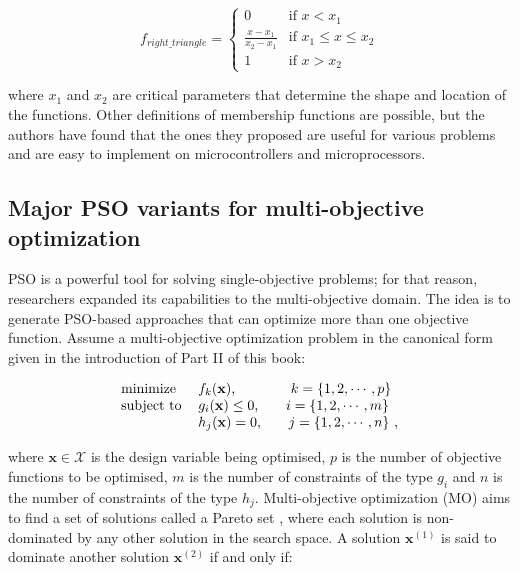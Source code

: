 \begin{equation}
    f_{right\_triangle} = \begin{cases}
    0 & \text{if $x < x_1$}\\
    \frac{x -x_1}{x_2 -x_1} & \text{if $x_1 \leq x \leq x_2$}\\
    1 & \text{if $x > x_2$}
    \end{cases}
\end{equation}

\noindent where $x_1$ and $x_2$ are critical parameters that determine the shape and location of the functions. Other definitions of membership functions are possible, but the authors have found that the ones they proposed are useful for various problems and are easy to implement on microcontrollers and microprocessors.

\subsection{Major PSO variants for multi-objective optimization}
\label{sec:variants2}

PSO is a powerful tool for solving single-objective problems; for that reason, researchers expanded its capabilities to the multi-objective domain. The idea is to generate PSO-based approaches that can optimize more than one objective function. Assume a multi-objective optimization problem in the canonical form given in the introduction of Part II of this book:

\[
\begin{tabular}{ll}
minimize        & $f_k(\mathbf{x})$, \ \ \ \ \ \ \ \ \ \ \ $k=\{1,2,\cdots,p\}$ \\ 
subject to      & $g_i(\mathbf{x}) \leq 0$, \ \ \ \ \ $i=\{1,2,\cdots,m\}$ \\
                & $h_j(\mathbf{x}) = 0$, \ \ \ \ \ $j=\{1,2,\cdots,n\}$ ,\\
\end{tabular}
\]

\noindent where $\mathbf{x} \in \mathcal{X}$ is the design variable being optimised, $p$ is the number of objective functions to be optimised, $m$ is the number of constraints of the type $g_i$ and $n$ is the number of constraints of the type $h_j$. 
Multi-objective optimization (MO) aims to find a set of solutions called a Pareto set \cite{coello2007evolutionary}, where each solution is non-dominated by any other solution in the search space. A solution $\mathbf{x}^{(1)}$ is said to dominate another solution $\mathbf{x}^{(2)}$ if and only if:

